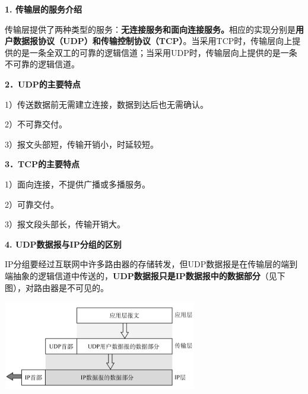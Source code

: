 \textbf{{1. 传输层的服务介绍}}

{{传输层提供了两种类型的服务：}}\textbf{{无连接服务和面向连接服务。}}{相应的实现分别是\textbf{用户数据报协议（UDP）和传输控制协议（TCP）}。当采用TCP时，传输层向上提供的是一条全双工的可靠的逻辑信道；当采用UDP时，传输层向上提供的是一条不可靠的逻辑信道。}

\textbf{{2．UDP的主要特点}}

1）传送数据前无需建立连接，数据到达后也无需确认。

2）不可靠交付。

3）报文头部短，传输开销小，时延较短。

\textbf{{3．TCP的主要特点}}

1）面向连接，不提供广播或多播服务。

2）可靠交付。

3）报文段头部长，传输开销大。

\textbf{{4. UDP数据报与IP分组的区别}}

IP分组要经过互联网中许多路由器的存储转发，但UDP数据报是在传输层的端到端抽象的逻辑信道中传送的，\textbf{UDP数据报只是IP数据报中的数据部分}（见下图），对路由器是不可见的。

\includegraphics[width=3.33333in,height=1.53125in]{png-jpeg-pics/6AA6B83CA31AA36641EBBDBCB8F7FEA2.png}
